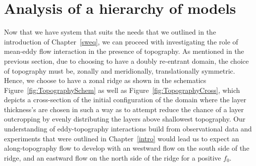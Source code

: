\documentclass[12pt,a4paper]{report}
\newcommand*\figref[1]{Figure~\ref{#1}}
\begin{document}
\chapter{Analysis of a hierarchy of models}
\label{analysis}

Now that we have system that suits the needs that we outlined in the
introduction of Chapter~\ref{sweq}, we can proceed with investigating the
role of mean-eddy flow interaction in the presence of topography.
As mentioned in the previous section, due to choosing to have a doubly re-entrant
domain, the choice of topography must be, zonally and meridionally, 
translationally symmetric.
Hence, we choose to have a zonal ridge as shown in the schematics
 \figref{fig:TopographySchem} as well as \figref{fig:TopographyCross}, which
 depicts a cross-section of the initial configuration of the domain where
 the layer thickness's are chosen in such a way as to attempt reduce the chance of a
 layer outcropping by evenly distributing the layers above shallowest topography. Our
 understanding of eddy-topography interactions build from observational 
 data and experiments that were outlined in Chapter~\ref{intro} would lead us
 to expect an along-topography flow to develop with an westward flow on the south side of
 the ridge, and an eastward flow on the north side of the ridge for a positive $f_{0}$.
\end{document}
